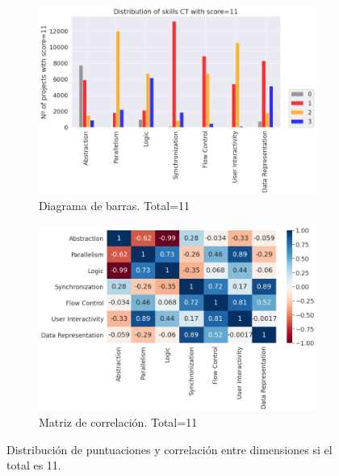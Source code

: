 \documentclass[a4paper, 12pt]{book}
\begin{document}
\begin{figure}[H]
    \centering
    \begin{subfigure}[h]{.49\textwidth} 
        \includegraphics[width=\textwidth]{img/distribucion_11_Scratch}
        \caption{Diagrama de barras. Total=11}
        \label{fig:total11}
    \end{subfigure}       
    \begin{subfigure}[h]{.49\textwidth} 
        \includegraphics[width=\textwidth]{img/corr_11_Scratch}
        \caption{Matriz de correlación. Total=11}
        \label{fig:corr11}
    \end{subfigure}
     \caption{Distribución de puntuaciones y correlación entre dimensiones si el total es 11.}
\end{figure}
\end{document}
